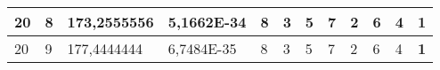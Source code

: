 \documentclass[conference]{IEEEtran}
\begin{document}
\begin{table*}[]
\begin{tabular}{|llll|llllllll|}
\multicolumn{1}{|l|}{20}                                                             & \multicolumn{1}{l|}{8}                                                                 & \multicolumn{1}{l|}{173,2555556}                                                           & 5,1662E-34                              & \multicolumn{1}{l|}{8}                                                           & \multicolumn{1}{l|}{3}                                                           & \multicolumn{1}{l|}{5}                                                           & \multicolumn{1}{l|}{7}                                                           & \multicolumn{1}{l|}{2}                                                           & \multicolumn{1}{l|}{6}                                                           & \multicolumn{1}{l|}{4}                                                           & \textbf{1}                          \\ \hline
\multicolumn{1}{|l|}{20}                                                             & \multicolumn{1}{l|}{9}                                                                 & \multicolumn{1}{l|}{177,4444444}                                                           & 6,7484E-35                              & \multicolumn{1}{l|}{8}                                                           & \multicolumn{1}{l|}{3}                                                           & \multicolumn{1}{l|}{5}                                                           & \multicolumn{1}{l|}{7}                                                           & \multicolumn{1}{l|}{2}                                                           & \multicolumn{1}{l|}{6}                                                           & \multicolumn{1}{l|}{4}                                                           & \textbf{1}                          \\ \hline
\end{tabular}
\label{tab:tabla1.1}
\end{table*}
\end{document}

